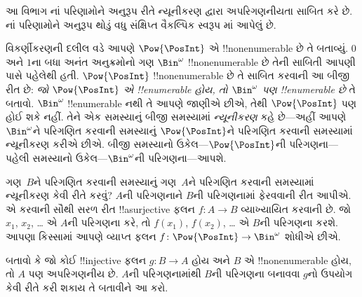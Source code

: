 \documentclass[../../../include/open-logic-section]{subfiles}
\begin{document}


\begin{editorial}
  આ વિભાગ નાં પરિણામોને અનુરૂપ રીતે
  ન્યૂનીકરણ દ્વારા અપરિગણનીયતા સાબિત કરે છે. નાં
  પરિણામોને અનુરૂપ થોડું વધુ સંક્ષિપ્ત વૈકલ્પિક સ્વરૂપ
  માં આપેલું છે.
\end{editorial}

વિકર્ણીકરણની દલીલ વડે આપણે $\Pow{\PosInt}$ એ !!{nonenumerable}
છે તે બતાવ્યું. $0$ અને $1$ના બધા અનંત અનુક્રમોનો ગણ
$\Bin^\omega$ !!{nonenumerable} છે તેની સાબિતી આપણી પાસે
પહેલેથી હતી. $\Pow{\PosInt}$ !!{nonenumerable} છે તે સાબિત કરવાની
આ બીજી રીત છે: \emph{જો $\Pow{\PosInt}$ એ !!{enumerable} હોય, તો
$\Bin^\omega$ પણ !!{enumerable} છે} તે બતાવો. $\Bin^\omega$
!!{enumerable} નથી તે આપણે જાણીએ છીએ, તેથી $\Pow{\PosInt}$ પણ
હોઈ શકે નહીં. તેને એક સમસ્યાનું બીજી સમસ્યામાં \emph{ન્યૂનીકરણ}
કહે છે---અહીં આપણે $\Bin^\omega$ને પરિગણિત કરવાની સમસ્યાનું
$\Pow{\PosInt}$ને પરિગણિત કરવાની સમસ્યામાં ન્યૂનીકરણ કરીએ છીએ.
બીજી સમસ્યાનો ઉકેલ---$\Pow{\PosInt}$ની પરિગણના---પહેલી સમસ્યાનો
ઉકેલ---$\Bin^\omega$ની પરિગણના---આપશે.

ગણ~$B$ને પરિગણિત કરવાની સમસ્યાનું ગણ~$A$ને પરિગણિત કરવાની
સમસ્યામાં ન્યૂનીકરણ કેવી રીતે કરવું? $A$ની પરિગણનાને $B$ની
પરિગણનામાં ફેરવવાની રીત આપીએ. એ કરવાની સૌથી સરળ રીત
!!a{surjective} ફલન $f\colon A \to B$ વ્યાખ્યાયિત કરવાની છે.
જો $x_1$, $x_2$, \dots{} એ $A$ની પરિગણના કરે, તો
$f(x_1)$, $f(x_2)$, \dots{} એ $B$ની પરિગણના કરશે.
આપણા કિસ્સામાં આપણે વ્યાપ્ત ફલન
$f\colon \Pow{\PosInt} \to \Bin^\omega$ શોધીએ છીએ.

\begin{prob}
બતાવો કે જો કોઈ !!{injective} ફલન $g\colon B \to A$ હોય અને
$B$ એ !!{nonenumerable} હોય, તો $A$ પણ અપરિગણનીય છે.
$A$ની પરિગણનામાંથી $B$ની પરિગણના બનાવવા $g$નો ઉપયોગ કેવી રીતે
કરી શકાય તે બતાવીને આ કરો.
\end{prob}
\end{document}
